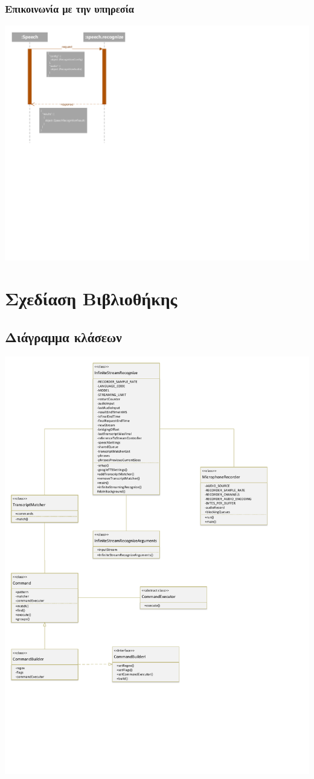 \documentclass[oneside, 12pt]{book}
\begin{document}
\subsection{Επικοινωνία με την υπηρεσία}
\includegraphics{uml/library_service_sequence_diagram.pdf}
\chapter{Σχεδίαση Βιβλιοθήκης}
\label{ch:σχεδίαση-βιβλιοθήκης}
\newpage
\section{Διάγραμμα κλάσεων}\label{sec:διάγραμμα-κλάσεων}
\includegraphics[scale=0.5]{uml/library_uml_class_diagram.pdf}
\newpage
\end{document}
